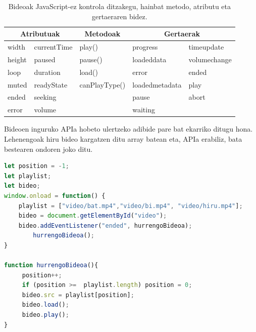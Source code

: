 \begin{table}[]
\begin{tabular}{@{}lllll@{}}
\toprule
\multicolumn{2}{c}{\textbf{Atributuak}} & \multicolumn{1}{c}{\textbf{Metodoak}} & \multicolumn{2}{c}{\textbf{Gertaerak}} \\ \midrule
width            & currentTime          & play()   \index{play()}                             & progress            & timeupdate       \\
height           & paused               & pause()   \index{pause()}                            & loadeddata          & volumechange     \\
loop             & duration             & load() \index{load()}                               & error               & ended            \\
muted            & readyState           & canPlayType()   \index{canPlayType()}                       & loadedmetadata      & play            \\
ended            & seeking              &                                       & pause               & abort            \\
error            & volume               &                                       & waiting             &                  \\ \bottomrule
\end{tabular}
\caption{Bideoak JavaScript-ez kontrola ditzakegu, hainbat metodo, atributu eta gertaeraren bidez.}
\label{tab:bideoAPI}
\end{table}

Bideoen inguruko APIa hobeto ulertzeko adibide pare bat ekarriko ditugu hona. Lehenengoak hiru bideo kargatzen ditu array batean eta, APIa erabiliz, bata bestearen ondoren joko ditu. 

\begin{lstlisting}[language=JavaScript]
let position = -1;
let playlist;
let bideo;
window.onload = function() {
	playlist = ["video/bat.mp4","video/bi.mp4", "video/hiru.mp4"];
	bideo = document.getElementById("video");
	bideo.addEventListener("ended", hurrengoBideoa);
        hurrengoBideoa();
}

function hurrengoBideoa(){
     position++;
     if (position >=  playlist.length) position = 0;
     bideo.src = playlist[position];
     bideo.load();
     bideo.play();
}
\end{lstlisting}


